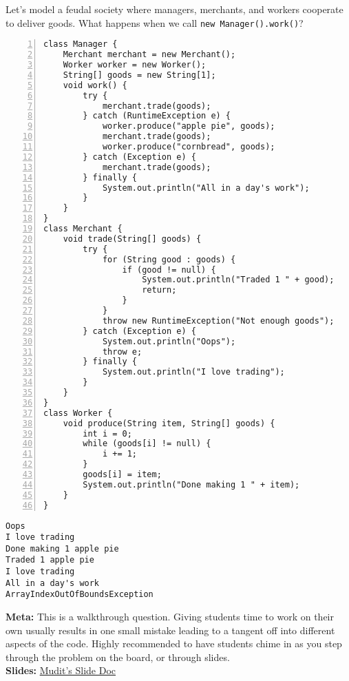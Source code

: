 \question Let's model a feudal society where managers, merchants, and workers cooperate to deliver goods. What happens when we call \texttt{new Manager().work()}?

\begin{lstlisting}[basicstyle=\ttfamily\footnotesize,
                   numberstyle=\ttfamily\tiny, numbers=left]
class Manager {
    Merchant merchant = new Merchant();
    Worker worker = new Worker();
    String[] goods = new String[1];
    void work() {
        try {
            merchant.trade(goods);
        } catch (RuntimeException e) {
            worker.produce("apple pie", goods);
            merchant.trade(goods);
            worker.produce("cornbread", goods);
        } catch (Exception e) {
            merchant.trade(goods);
        } finally {
            System.out.println("All in a day's work");
        }
    }
}
class Merchant {
    void trade(String[] goods) {
        try {
            for (String good : goods) {
                if (good != null) {
                    System.out.println("Traded 1 " + good);
                    return;
                }
            }
            throw new RuntimeException("Not enough goods");
        } catch (Exception e) {
            System.out.println("Oops");
            throw e;
        } finally {
            System.out.println("I love trading");
        }
    }
}
class Worker {
    void produce(String item, String[] goods) {
        int i = 0;
        while (goods[i] != null) {
            i += 1;
        }
        goods[i] = item;
        System.out.println("Done making 1 " + item);
    }
}
\end{lstlisting}

\begin{solution}
\begin{verbatim}
Oops
I love trading
Done making 1 apple pie
Traded 1 apple pie
I love trading
All in a day's work
ArrayIndexOutOfBoundsException
\end{verbatim}
\textbf{Meta:} This is a walkthrough question. Giving students time to work
on their own usually results in one small mistake leading to a tangent off into
different aspects of the code. Highly recommended to have students chime in
as you step through the problem on the board, or through slides. \\
\textbf{Slides:} \href{https://docs.google.com/presentation/d/1j418bduZS2Ltm6dVVg-b3WpGbOGrRUm6DKRkZCByuaQ/edit?usp=sharing}{Mudit's Slide Doc}


\end{solution}

